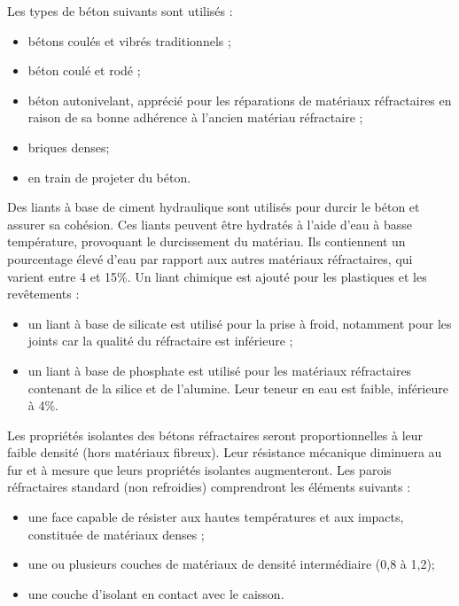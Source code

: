 \vspace{0.3cm}
Les types de béton suivants sont utilisés :
\begin{itemize}
    \item bétons coulés et vibrés traditionnels ;
    \item béton coulé et rodé ;
    \item béton autonivelant, apprécié pour les réparations de matériaux réfractaires en raison de sa bonne adhérence à l'ancien matériau réfractaire ;
    \item briques denses;
    \item en train de projeter du béton.
\end{itemize}


Des liants à base de ciment hydraulique sont utilisés pour durcir le béton et assurer sa cohésion. Ces liants peuvent être hydratés à l'aide d'eau à basse température, provoquant le durcissement du matériau. Ils contiennent un pourcentage élevé d'eau par rapport aux autres matériaux réfractaires, qui varient entre 4 et 15\%.
\vspace{0.3cm}
Un liant chimique est ajouté pour les plastiques et les revêtements :
\begin{itemize}
    \item un liant à base de silicate est utilisé pour la prise à froid, notamment pour les joints car la qualité du réfractaire est inférieure ;
    \item un liant à base de phosphate est utilisé pour les matériaux réfractaires contenant de la silice et de l'alumine. Leur teneur en eau est faible, inférieure à 4\%.
    
\end{itemize}

Les propriétés isolantes des bétons réfractaires seront proportionnelles à leur faible densité (hors matériaux fibreux). Leur résistance mécanique diminuera au fur et à mesure que leurs propriétés isolantes augmenteront.
Les parois réfractaires standard (non refroidies) comprendront les éléments suivants :
\begin{itemize}
    \item une face capable de résister aux hautes températures et aux impacts, constituée de matériaux denses ;
    \item une ou plusieurs couches de matériaux de densité intermédiaire (0,8 à 1,2);
    \item une couche d'isolant en contact avec le caisson.
\end{itemize}

